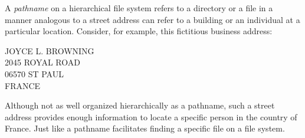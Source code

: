 
A \emph{pathname} on a hierarchical \posix file system refers to a
directory or a file in a manner analogous to a street address can
refer to a building or an individual at a particular location.
Consider, for example, this fictitious business address:

\begin{xnote}
JOYCE L. BROWNING \\
2045 ROYAL ROAD \\
06570 ST PAUL \\
FRANCE
\end{xnote}

Although not as well organized hierarchically as a \posix pathname,
such a street address provides enough information to locate a specific
person in the country of France.  Just like a pathname facilitates
finding a specific file on a file system.


